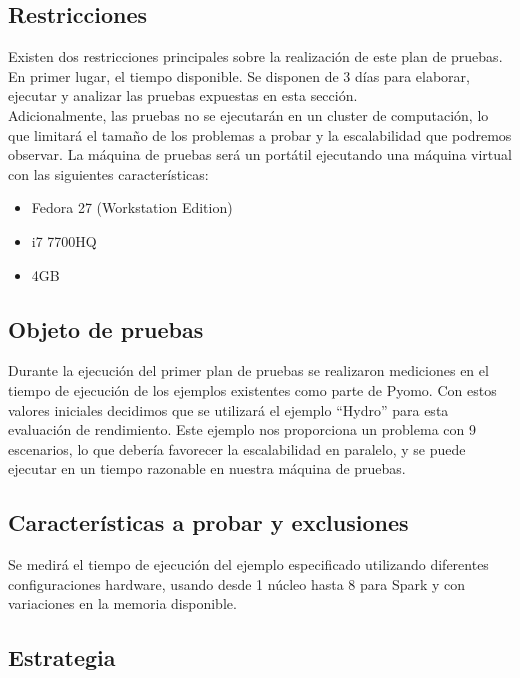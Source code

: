 \subsection{Restricciones}

Existen dos restricciones principales sobre la realización de este plan de pruebas. En primer lugar, el tiempo disponible. Se disponen de 3 días para elaborar, ejecutar y analizar las pruebas expuestas en esta sección. \\

Adicionalmente, las pruebas no se ejecutarán en un cluster de computación, lo que limitará el tamaño de los problemas a probar y la escalabilidad que podremos observar. La máquina de pruebas será un portátil ejecutando una máquina virtual con las siguientes características:

\begin{itemize}
    \item Fedora 27 (Workstation Edition)
    \item i7 7700HQ
    \item 4GB
\end{itemize}

\subsection{Objeto de pruebas}

Durante la ejecución del primer plan de pruebas se realizaron mediciones en el tiempo de ejecución de los ejemplos existentes como parte de Pyomo. Con estos valores iniciales decidimos que se utilizará el ejemplo ``Hydro'' para esta evaluación de rendimiento. Este ejemplo nos proporciona un problema con 9 escenarios, lo que debería favorecer la escalabilidad en paralelo, y se puede ejecutar en un tiempo razonable en nuestra máquina de pruebas.

\subsection{Características a probar y exclusiones}

Se medirá el tiempo de ejecución del ejemplo especificado utilizando diferentes configuraciones hardware, usando desde 1 núcleo hasta 8 para Spark y con variaciones en la memoria disponible.

\subsection{Estrategia}

